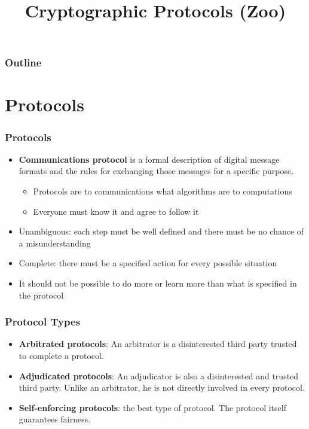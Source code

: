 

\title{Cryptographic Protocols (Zoo)}


\maketitle
\begin{frame}
\frametitle{Outline}
\tableofcontents
\end{frame}
\section{Protocols}
\begin{frame}\frametitle{Protocols}
\begin{itemize}
\item \textbf{Communications protocol} is a formal description of digital message formats and the rules for exchanging those messages for a specific purpose.
\begin{itemize}
\item Protocols are to communications what algorithms are to computations
\item Everyone must know it and agree to follow it
\end{itemize}
\item Unambiguous: each step must be well defined and there must be no chance of a misunderstanding
\item Complete: there must be a specified action for every possible situation
\item It should not be possible to do more or learn more than what is specified in the protocol
\end{itemize}
\end{frame}
\begin{frame}\frametitle{Protocol Types}
\begin{itemize}
\item \textbf{Arbitrated protocols}: An arbitrator is a disinterested third party trusted to complete a protocol.
\item \textbf{Adjudicated protocols}: An adjudicator is also a disinterested and trusted third party. Unlike an arbitrator, he is not directly involved in every protocol.
\item \textbf{Self-enforcing protocols}: the best type of protocol. The protocol itself guarantees fairness.
\end{itemize}
\end{frame}
